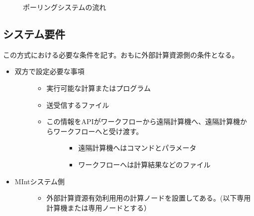 \documentclass[letterpaper,10pt,dvipdfmx,openany]{sphinxmanual}
\begin{document}
\begin{figure}[htbp]
\centering
\capstart

\caption{ポーリングシステムの流れ}\label{\detokenize{using_distributed_properties:id46}}\end{figure}

\newpage


\subsection{システム要件}
\label{\detokenize{using_distributed_properties:id18}}
この方式における必要な条件を記す。おもに外部計算資源側の条件となる。
\begin{itemize}
\item {} \begin{description}
\item[{双方で設定必要な事項}] \leavevmode\begin{itemize}
\item {} 
実行可能な計算またはプログラム

\item {} 
送受信するファイル

\item {} \begin{description}
\item[{この情報をAPIがワークフローから遠隔計算機へ、遠隔計算機からワークフローへと受け渡す。}] \leavevmode\begin{itemize}
\item {} 
遠隔計算機へはコマンドとパラメータ

\item {} 
ワークフローへは計算結果などのファイル

\end{itemize}

\end{description}

\end{itemize}

\end{description}

\item {} \begin{description}
\item[{MIntシステム側}] \leavevmode\begin{itemize}
\item {} 
外部計算資源有効利用用の計算ノードを設置してある。(以下専用計算機または専用ノードとする）


\end{itemize}
\end{description}
\end{itemize}
\end{document}
